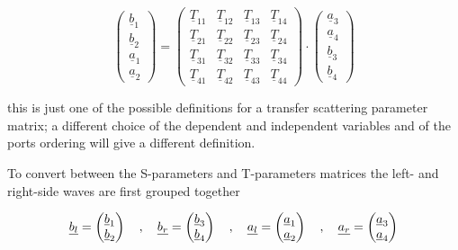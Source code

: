 \begin{itemize}
\begin{equation}
\label{eq:tparam4def}
\begin{pmatrix}
\underline{b}_{1}\\
\underline{b}_{2}\\
\underline{a}_{1}\\
\underline{a}_{2}
\end{pmatrix}
=
\begin{pmatrix}
\underline{T}_{11} & \underline{T}_{12} & \underline{T}_{13} & \underline{T}_{14}\\
\underline{T}_{21} & \underline{T}_{22} & \underline{T}_{23} & \underline{T}_{24}\\
\underline{T}_{31} & \underline{T}_{32} & \underline{T}_{33} & \underline{T}_{34}\\
\underline{T}_{41} & \underline{T}_{42} & \underline{T}_{43} & \underline{T}_{44}
\end{pmatrix}
\cdot
\begin{pmatrix}
\underline{a}_{3}\\
\underline{a}_{4}\\
\underline{b}_{3}\\
\underline{b}_{4}
\end{pmatrix}
\end{equation}

this is just one of the possible definitions for a transfer scattering parameter matrix; a different choice of the dependent and independent variables and of the ports ordering will give a different definition.

\end{itemize}

To convert between the S-parameters and T-parameters matrices the left- and right-side waves are first grouped together

\begin{equation}
\underline{b_l}\\
=
\begin{pmatrix}
\underline{b}_{1}\\
\underline{b}_{2}\\
\end{pmatrix}
\quad , \quad
\underline{b_r}\\
=
\begin{pmatrix}
\underline{b}_{3}\\
\underline{b}_{4}\\
\end{pmatrix}
\quad , \quad
\underline{a_l}\\
=
\begin{pmatrix}
\underline{a}_{1}\\
\underline{a}_{2}\\
\end{pmatrix}
\quad , \quad
\underline{a_r}\\
=
\begin{pmatrix}
\underline{a}_{3}\\
\underline{a}_{4}\\
\end{pmatrix}
\end{equation}

